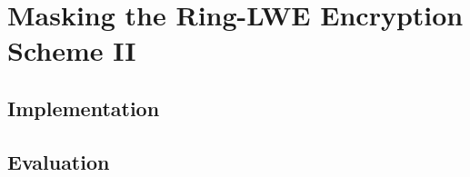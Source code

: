 %
%

\chapter{Masking the Ring-LWE Encryption Scheme II}

\section{Implementation}

\section{Evaluation}